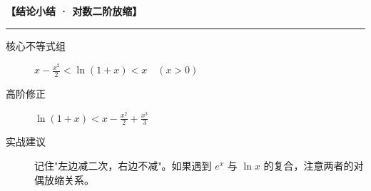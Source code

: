 \begin{summarybox}
\textbf{【结论小结 · 对数二阶放缩】}
\vspace{0.8em}
\hrule
\vspace{0.8em}

\begin{description}
    \item[核心不等式组] $x - \frac{x^2}{2} < \ln(1+x) < x \quad (x > 0)$
    \item[高阶修正] $\ln(1+x) < x - \frac{x^2}{2} + \frac{x^3}{3}$
    \item[实战建议] 记住"左边减二次，右边不减"。如果遇到 $e^x$ 与 $\ln x$ 的复合，注意两者的对偶放缩关系。
\end{description}
\end{summarybox}